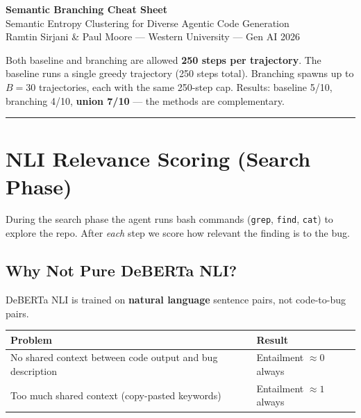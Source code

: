 \documentclass[10pt,a4paper,twocolumn]{article}
\begin{document}
\begin{center}
{\LARGE\bfseries\sffamily\color{MidnightBlue} Semantic Branching Cheat Sheet}\\[4pt]
{\normalsize\sffamily Semantic Entropy Clustering for Diverse Agentic Code Generation}\\[2pt]
{\small\color{gray}\sffamily Ramtin Sirjani \& Paul Moore --- Western University --- Gen AI 2026}
\end{center}

\vspace{4pt}
\begin{notebox}[title=Compute Budget]
Both baseline and branching are allowed \textbf{250 steps per trajectory}. The baseline runs a single greedy trajectory (250 steps total). Branching spawns up to $B{=}30$ trajectories, each with the same 250-step cap. Results: baseline 5/10, branching 4/10, \textbf{union 7/10} --- the methods are complementary.
\end{notebox}
\noindent\textcolor{MidnightBlue}{\rule{\columnwidth}{1pt}}
\vspace{2pt}

\section{NLI Relevance Scoring (Search Phase)}

During the search phase the agent runs bash commands (\texttt{grep}, \texttt{find}, \texttt{cat}) to explore the repo. After \emph{each} step we score how relevant the finding is to the bug.

\subsection{Why Not Pure DeBERTa NLI?}

DeBERTa NLI is trained on \textbf{natural language} sentence pairs, not code-to-bug pairs.

\begin{small}
\begin{tabular}{@{}p{}p{}@{}}
\toprule
\textbf{Problem} & \textbf{Result} \\
\midrule
No shared context between code output and bug description & Entailment $\approx 0$ always \\
Too much shared context (copy-pasted keywords) & Entailment $\approx 1$ always \\
\bottomrule
\end{tabular}
\end{small}
\end{document}
